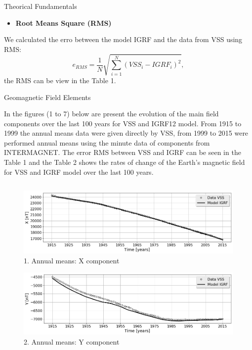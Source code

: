\documentclass[final,t]{beamer}
\begin{document}
\begin{columns}[t]
\begin{column}{.47\linewidth}
\begin{block}{Theorical Fundamentals}
		\begin{itemize}
			\item 	\textbf{Root Means Square (RMS)}
		\end{itemize}
		We calculated the erro between the model IGRF and the data from VSS using RMS:
		\[e_{RMS}=\frac{1}{N} \sqrt{\sum\limits_{i=1}^{N}(VSS_{i}-IGRF_{i})^{2}}, 
		\]
		the RMS can be view in the Table 1.
		
		
	\end{block}	



\begin{block}{Geomagnetic Field Elements}
	\justifying
	
In the figures (1 to 7) below are present the evolution of the main field components over the last 100 years for VSS and IGRF12 model. From 1915 to 1999 the  annual means data  were given directly by VSS, from 1999 to 2015 were performed annual means using the minute data of components from INTERMAGNET. The error RMS between VSS and IGRF can be seen in the Table 1 and the Table 2 shows the rates of change of the Earth's magnetic field  for VSS and IGRF model over the last 100 years.
\\
\end{block}

\begin{columns}

\begin{column}{.49\linewidth}

\begin{block}

\begin{figure}
\centering
\includegraphics[scale=0.6]{"figs_ed/X mean all_V3"}
\caption{1. Annual means: X component}
\label{fig:Xmeanall_V3}
\end{figure}
	
	
\begin{figure}
\centering
\includegraphics[scale=0.6]{"figs_ed/Y mean all_v3"}
\caption{2. Annual means: Y component}
\label{fig:Ymeanall_v3}
\end{figure}


\end{block}
\end{column}
\end{columns}
\end{column}
\end{columns}
\end{document}
